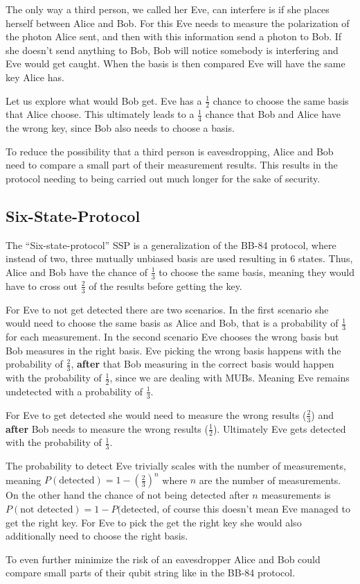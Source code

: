\documentclass[a4paper]{article}
\begin{document}
The only way a third person, we called her Eve, can interfere is if she places
herself between Alice and Bob. For this Eve needs to measure the polarization
of the photon Alice sent, and then with this information send a photon to Bob.
If she doesn't send anything to Bob, Bob will notice somebody is interfering
and Eve would get caught. When the basis is then compared Eve will have the
same key Alice has.

Let us explore what would Bob get. Eve has a $\frac{1}{2}$ chance to choose the
same basis that Alice choose. This ultimately leads to a $\frac{1}{4}$ chance that Bob
and Alice have the wrong key, since Bob also needs to choose a basis.

To reduce the possibility that a third person is eavesdropping, Alice and Bob
need to compare a small part of their measurement results. This results in the
protocol needing to being carried out much longer for the sake of security.

\subsection{Six-State-Protocol}
The ``Six-state-protocol'' SSP is a generalization of the BB-84 protocol, where
instead of two, three mutually unbiased basis are used resulting in 6 states.
Thus, Alice and Bob have the chance of $\frac{1}{3}$ to choose the same basis,
meaning they would have to cross out $\frac{2}{3}$ of the results before
getting the key.

For Eve to not get detected there are two scenarios. In the first scenario she
would need to choose the same basis as Alice and Bob, that is a probability
of $\frac{1}{3}$ for each measurement. In the second scenario Eve
chooses the wrong basis but Bob measures in the right basis. Eve picking the
wrong basis happens with the probability of $\frac{2}{3}$, \textbf{after} that
Bob measuring in the correct basis would happen with the probability of
$\frac{1}{2}$, since we are dealing with MUBs.  Meaning Eve remains undetected
with a probability of $\frac{1}{3}$.

For Eve to get detected she would need to measure the wrong results
($\frac{2}{3}$) and \textbf{after} Bob needs to measure the wrong results
($\frac{1}{2}$). Ultimately Eve gets detected with the probability of
$\frac{1}{3}$.

The probability to detect Eve trivially scales with the number of measurements,
meaning $P(\text{detected}) = 1 - (\frac{2}{3})^n$ where $n$ are the
number of measurements. On the other hand the chance of not being detected
after $n$ measurements is $P(\text{not detected}) = 1 - P(\text{detected}$,
of course this doesn't mean Eve managed to get the right key. For Eve to pick
the get the right key she would also additionally need to choose the right
basis.

To even further minimize the risk of an eavesdropper Alice and Bob could
compare small parts of their qubit string like in the BB-84 protocol.
\nocite{six-state}
\nocite{teleportation}
\printbibliography
\end{document}

